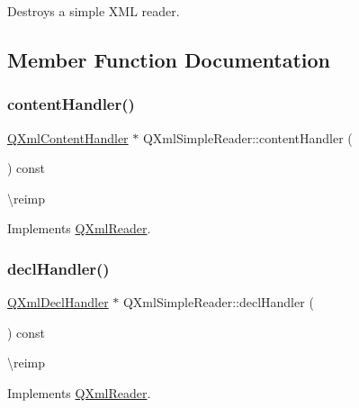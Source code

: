 Destroys a simple X\+ML reader. 

\subsection{Member Function Documentation}
\mbox{\label{class_q_xml_simple_reader_ad2c6d2fd753e261308e7171e25a40d37}} 
\subsubsection{\texorpdfstring{contentHandler()}{contentHandler()}}
{\footnotesize\ttfamily \mbox{\hyperlink{class_q_xml_content_handler}{Q\+Xml\+Content\+Handler}} $\ast$ Q\+Xml\+Simple\+Reader\+::content\+Handler (\begin{DoxyParamCaption}{ }\end{DoxyParamCaption}) const\hspace{0.3cm}{\ttfamily [virtual]}}

\textbackslash{}reimp 

Implements \mbox{\hyperlink{class_q_xml_reader_ae86bc7841c2dbf289b300a1b00f93187}{Q\+Xml\+Reader}}.

\mbox{\label{class_q_xml_simple_reader_abf978e05e6844e5eaa983eeb39581b16}} 
\subsubsection{\texorpdfstring{declHandler()}{declHandler()}}
{\footnotesize\ttfamily \mbox{\hyperlink{class_q_xml_decl_handler}{Q\+Xml\+Decl\+Handler}} $\ast$ Q\+Xml\+Simple\+Reader\+::decl\+Handler (\begin{DoxyParamCaption}{ }\end{DoxyParamCaption}) const\hspace{0.3cm}{\ttfamily [virtual]}}

\textbackslash{}reimp 

Implements \mbox{\hyperlink{class_q_xml_reader_a635ea0540ef702ccd0db0a15958d3fea}{Q\+Xml\+Reader}}.

\mbox{\label{class_q_xml_simple_reader_ad75f6836c8472e6951ae83341439e89e}} 
